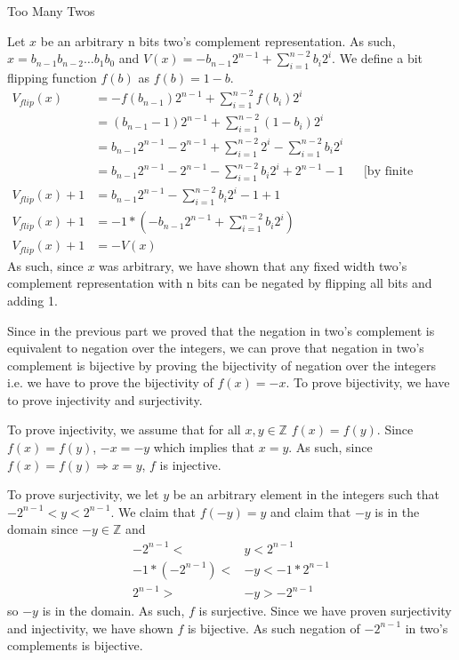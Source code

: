 \documentclass[11pt, nopagenumbers]{adamblan-hw}
\begin{document}
\begin{question}{Too Many Twos}
\begin{part}
Let $x$ be an arbitrary n bits two's complement representation. As such, $x = b_{n-1}b_{n-2}\dots b_1b_0$ and 
$V(x) = -b_{n-1}2^{n-1} + \sum\limits_{i=1}^{n - 2}{b_i2^i}$. We define a bit flipping function $f(b)$ as $f(b) = 1-b$.
\begin{align*}
V_{flip}(x) &= -f(b_{n-1})2^{n-1} + \sum\limits_{i=1}^{n - 2}{f(b_i)2^i} \\
&= (b_{n-1} - 1)2^{n-1} + \sum\limits_{i=1}^{n - 2}{(1 - b_i) 2^i}\\
&= b_{n-1}2^{n-1} - 2^{n-1} + \sum\limits_{i=1}^{n - 2}{2^i}  - \sum\limits_{i=1}^{n - 2}{b_i2^i}\\
&= b_{n-1}2^{n-1} - 2^{n-1} - \sum\limits_{i=1}^{n - 2}{b_i2^i} + 2^{n-1} - 1 && \text{[by finite geometric series theorem]}\\
V_{flip}(x) + 1 &= b_{n-1}2^{n-1} - \sum\limits_{i=1}^{n - 2}{b_i2^i} - 1 + 1\\
V_{flip}(x) + 1 &= -1 * (-b_{n-1}2^{n-1} + \sum\limits_{i=1}^{n - 2}{b_i2^i}) \\
V_{flip}(x) + 1 &= -V(x)
\end{align*}
As such, since $x$ was arbitrary, we have shown that any fixed width  two's complement representation with n bits can be negated by flipping all bits and adding 1.

\end{part}

\begin{part}
Since in the previous part we proved that the negation in two's complement is equivalent to negation over the integers, we can
prove that negation in two's complement is bijective by proving the bijectivity of negation over the integers i.e.
we have to prove the bijectivity of $f(x) = -x$. To prove bijectivity, we have to prove injectivity and surjectivity.

To prove injectivity, we assume that for all $x, y \in \mathbb{Z}$ $f(x) = f(y)$. Since $f(x) = f(y)$,
$-x = -y$ which implies that $x = y$. As such, since $f(x) = f(y) \Rightarrow x = y$, $f$ is injective.

To prove surjectivity, we let $y$ be an arbitrary element in the integers such that $-2^{n-1} < y < 2^{n-1}$.
We claim that $f(-y) = y$ and claim that $-y$ is in the domain since 
$-y \in \mathbb{Z}$ and
\begin{align*}
-2^{n-1} < &y < 2^{n-1} \\
-1 * (-2^{n-1}) < &-y < -1 * 2^{n-1} \\
2^{n-1} > &-y > -2^{n-1}
\end{align*}
so $-y$ is in the domain. As such, $f$ is surjective. Since we have proven surjectivity and injectivity, we have shown $f$ is bijective. As such negation of $-2^{n-1}$ in two's complements is bijective.

\end{part}
\end{question}
\end{document}
